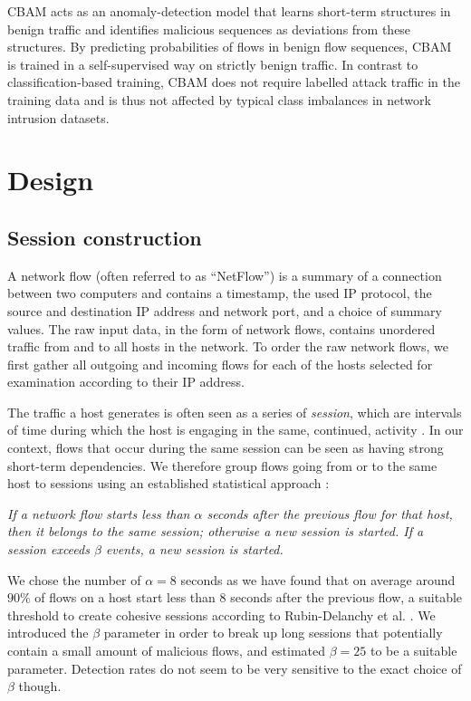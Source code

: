 CBAM acts as an anomaly-detection model that learns short-term structures in benign traffic and identifies malicious sequences as deviations from these structures. 
By predicting probabilities of flows in benign flow sequences, CBAM is trained in a self-supervised way  on strictly benign traffic. In contrast to classification-based training, CBAM does not require labelled attack traffic in the training data and is thus not affected by typical class imbalances in network intrusion datasets. 


\section{Design}\label{Sec:Design}

\subsection{Session construction}

A network flow (often referred to as ``NetFlow'') is a summary of a connection between two computers and contains a timestamp, the used IP protocol, the source and destination IP address and network port, and a choice of summary values.
The raw input data, in the form of network flows, contains unordered traffic from and to all hosts in the network. %
To order the raw network flows, we  first gather all outgoing and incoming flows for each of the hosts selected for examination according to their IP address. 

The traffic a host generates is often seen as a series of \emph{session}, which are intervals of time  during which the host is engaging in the same, continued, activity \cite{rubin2014three}. In our context, flows that occur during the same session can be seen as having strong short-term dependencies. We therefore group flows going from or to the same host to sessions using an established statistical approach \cite{rubin2014three}:

\textit{If a network flow starts less than $\alpha$ seconds after the previous flow for that host, then it belongs to the same session; otherwise a new session is started. If a session exceeds $\beta$ events, a new session is started.}


 
We chose the number of $\alpha=8$ seconds as we have found that on average around $90\%$ of flows on a host start less than $8$ seconds after the previous flow, a suitable threshold to create cohesive sessions according to Rubin-Delanchy et al. \cite{rubin2014three}. We introduced the $\beta$ parameter in order to break up long sessions that potentially contain a small amount of malicious flows, and estimated $\beta=25$ to be a suitable parameter. Detection rates do not seem to be very sensitive to the exact choice of $\beta$ though.

